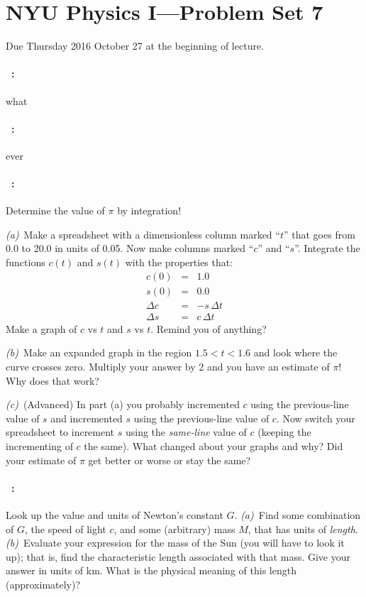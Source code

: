 \documentclass[12pt]{article}
\begin{document}
\section*{NYU Physics I---Problem Set 7}

Due Thursday 2016 October 27 at the beginning of lecture.

\paragraph{\problemname~\theproblem:}%
what

\paragraph{\problemname~\theproblem:}%
ever

\paragraph{\problemname~\theproblem:}%
Determine the value of $\pi$ by integration!

\textsl{(a)}~Make a spreadsheet with a dimensionless column marked
``$t$'' that goes from 0.0 to 20.0 in units of 0.05.  Now make columns
marked ``$c$'' and ``$s$''.  Integrate the functions $c(t)$ and
$s(t)$ with the properties that:
\begin{eqnarray}\displaystyle
c(0) & = & 1.0 \\
s(0) & = & 0.0 \\
\Delta c & = & -s\,\Delta t \\
\Delta s & = & c\,\Delta t
\end{eqnarray}
Make a graph of $c$ vs $t$ and $s$ vs $t$.  Remind you of anything?

\textsl{(b)}~Make an expanded graph in the region $1.5<t<1.6$ and
look where the curve crosses zero.  Multiply your answer by 2 and you
have an estimate of $\pi$!  Why does that work?

\textsl{(c)}~(Advanced) In part (a) you probably incremented $c$ using
the previous-line value of $s$ and incremented $s$ using the
previous-line value of $c$.  Now switch your spreadsheet to increment
$s$ using the \emph{same-line} value of $c$ (keeping the incrementing
of $c$ the same).  What changed about your graphs and why?  Did your
estimate of $\pi$ get better or worse or stay the same?

\paragraph{\problemname~\theproblem:}%
Look up the value and units of Newton's constant $G$.
\textsl{(a)}~Find some combination of $G$, the speed of light $c$, and
some (arbitrary) mass $M$, that has units of \emph{length}.
\textsl{(b)}~Evaluate your expression for the mass of the Sun (you
will have to look it up); that is, find the characteristic length
associated with that mass.  Give your answer in units of km.  What is
the physical meaning of this length (approximately)?
\end{document}
